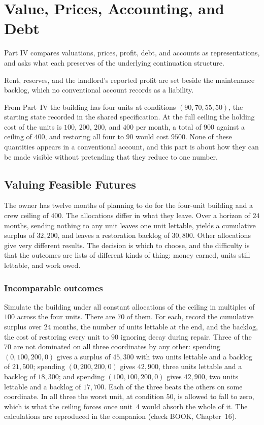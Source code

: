 \part{Value, Prices, Accounting, and Debt}
\label{part:IV}

Part IV compares valuations, prices, profit, debt, and accounts as representations, and asks what each preserves of the underlying continuation structure.

\begin{housing}Rent, reserves, and the landlord's reported profit are set beside the maintenance backlog, which no conventional account records as a liability.\end{housing}


From Part~IV the building has four units at conditions $(90,70,55,50)$, the starting state recorded in the shared specification. At the full ceiling the holding cost of the units is $100$, $200$, $200$, and $400$ per month, a total of $900$ against a ceiling of $400$, and restoring all four to $90$ would cost $9500$. None of these quantities appears in a conventional account, and this part is about how they can be made visible without pretending that they reduce to one number.

\chapter{Valuing Feasible Futures}\label{ch:16}

The owner has twelve months of planning to do for the four-unit building and a crew ceiling of $400$. The allocations differ in what they leave. Over a horizon of $24$ months, sending nothing to any unit leaves one unit lettable, yields a cumulative surplus of $32{,}200$, and leaves a restoration backlog of $30{,}800$. Other allocations give very different results. The decision is which to choose, and the difficulty is that the outcomes are lists of different kinds of thing: money earned, units still lettable, and work owed.

\section{Incomparable outcomes}

Simulate the building under all constant allocations of the ceiling in multiples of $100$ across the four units. There are $70$ of them. For each, record the cumulative surplus over $24$ months, the number of units lettable at the end, and the backlog, the cost of restoring every unit to $90$ ignoring decay during repair. Three of the $70$ are not dominated on all three coordinates by any other: spending $(0,100,200,0)$ gives a surplus of $45{,}300$ with two units lettable and a backlog of $21{,}500$; spending $(0,200,200,0)$ gives $42{,}900$, three units lettable and a backlog of $18{,}300$; and spending $(100,100,200,0)$ gives $42{,}900$, two units lettable and a backlog of $17{,}700$. Each of the three beats the others on some coordinate. In all three the worst unit, at condition $50$, is allowed to fall to zero, which is what the ceiling forces once unit~4 would absorb the whole of it. The calculations are reproduced in the companion (check BOOK, Chapter~16).

